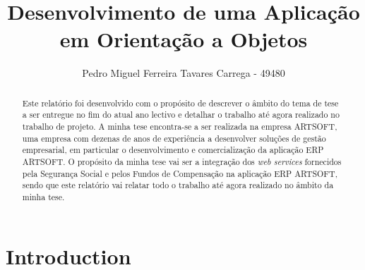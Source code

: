 \documentclass[sigplan]{acmart}
\begin{document}
\title{Desenvolvimento de uma Aplicação em Orientação a Objetos}


\author{Pedro Miguel Ferreira Tavares Carrega - 49480}


\renewcommand{\shortauthors}{Pedro Miguel Ferreira Tavares Carrega - 49480}

\begin{abstract}
Este relatório foi desenvolvido com o propósito de descrever o âmbito do tema de tese a ser entregue no fim do atual ano lectivo e detalhar o trabalho até agora realizado no trabalho de projeto. A minha tese encontra-se a ser realizada na empresa ARTSOFT, uma empresa com dezenas de anos de experiência a desenvolver soluções de gestão empresarial, em particular o desenvolvimento e comercialização da aplicação ERP ARTSOFT. O propósito da minha tese vai ser a integração dos \textit{web services} fornecidos pela Segurança Social e pelos Fundos de Compensação na aplicação ERP ARTSOFT, sendo que este relatório vai relatar todo o trabalho até agora realizado no âmbito da minha tese.
\end{abstract}




\maketitle

\section{Introduction}
\end{document}
